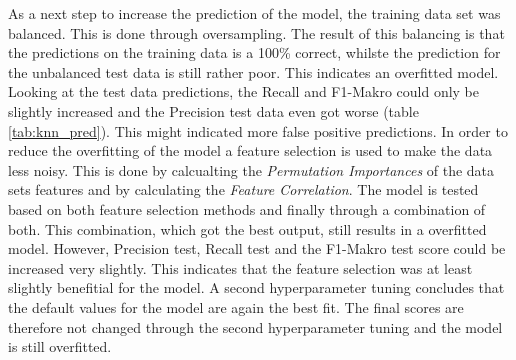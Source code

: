 As a next step to increase the prediction of the model, the training data set was balanced. This is done through oversampling. The result of this balancing is that the predictions on the training data is a 100\% correct, whilste the prediction for the unbalanced test data is still rather poor. This indicates an overfitted model. Looking at the test data predictions, the Recall and F1-Makro could only be slightly increased and the Precision test data even got worse (table \ref{tab:knn_pred}). This might indicated more false positive predictions. In order to reduce the overfitting of the model a feature selection is used to make the data less noisy. This is done by calcualting the \textit{Permutation Importances} of the data sets features and by calculating the \textit{Feature Correlation}. The model is tested based on both feature selection methods and finally through a combination of both. This combination, which got the best output, still results in a overfitted model. However, Precision test, Recall test and the F1-Makro test score could be increased very slightly. This indicates that the feature selection was at least slightly benefitial for the model. A second hyperparameter tuning concludes that the default values for the model are again the best fit. The final scores are therefore not changed through the second hyperparameter tuning and the model is still overfitted.


